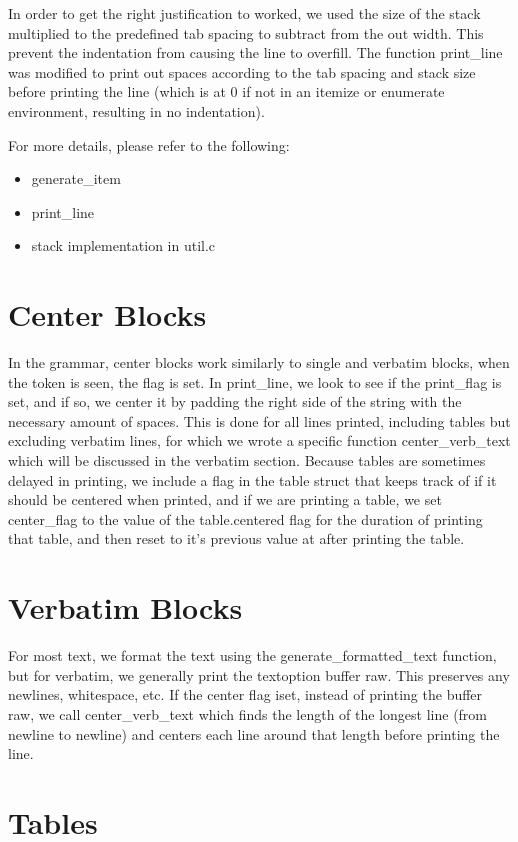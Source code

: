 In order to get the right justification to worked, we used the size of the stack multiplied
to the predefined tab spacing to subtract from the out width. This prevent the indentation
from causing the line to overfill. The function print_line was modified to print out spaces
according to the tab spacing and stack size before printing the line (which is at 0 if not
in an itemize or enumerate environment, resulting in no indentation).

For more details, please refer to the following:
\begin{itemize}
\item generate_item
\item print_line
\item stack implementation in util.c
\end{itemize}

\section{Center Blocks}
In the grammar, center blocks work similarly to single and verbatim blocks, when the token is seen, the flag is set. In print_line, we look to see if the print_flag is set, and if so, we center it by padding the right side of the string with the necessary amount of spaces. This is done for all lines printed, including tables but excluding verbatim lines, for which we wrote a specific function center_verb_text which will be discussed in the verbatim section. Because tables are sometimes delayed in printing, we include a flag in the table struct that keeps track of if it should be centered when printed, and if we are printing a table, we set center_flag to the value of the table.centered flag for the duration of printing that table, and then reset to it's previous value at after printing the table.

\section{Verbatim Blocks}
For most text, we format the text using the generate_formatted_text function, but for verbatim, we generally print the textoption buffer raw. This preserves any newlines, whitespace, etc. If the center flag iset, instead of printing the buffer raw, we call center_verb_text which finds the length of the longest line (from newline to newline) and centers each line around that length before printing the line.

\section{Tables}

